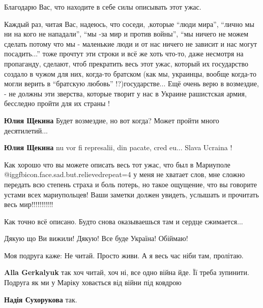 \begin{itemize}

Благодарю Вас, что находите в себе силы описывать этот ужас.

Каждый раз, читая Вас, надеюсь, что соседи, ,которые \enquote{люди мира},
\enquote{лично мы ни на кого не нападали}, \enquote{мы -за мир и против войны},
\enquote{мы ничего не можем сделать потому что мы - маленькие люди и от нас
ничего не зависит и нас могут посадить...} тоже прочтут эти строки и всё же
хоть что-то, даже несмотря на пропаганду, сделают, чтоб прекратить весь этот
ужас, который их государство создало в чужом для них, когда-то братском (как
мы, украинцы, вообще когда-то могли верить в \enquote{братскую любовь}
!?)государстве...  Ещё очень верю в возмездие, - не должны эти зверства,
которые творит у нас в Украине рашистская армия, бесследно пройти для их страны
!

\begin{itemize} %
\textbf{Юлия Щекина} Будет возмездие, но вот когда? Может пройти много десятилетий...

\textbf{Юлия Щекина} nu vor fi represalii, din pacate, cred eu... Slava Ucraina !
\end{itemize} %


Как хорошо что вы можете описать весь тот ужас, что был в Мариуполе  @igg{fbicon.face.sad.but.relieved}{repeat=4}  у
меня не хватает слов, мне сложно передать всю степень страха и боль потерь, но
такое ощущение, что вы говорите устами всех мариупольцев! Ваши заметки должен
увидеть, услышать и прочитать весь мир!!!!!!!!!!!


Как точно всё описано. Будто снова оказываешься там и сердце сжимается...

Дякую що Ви вижили! Дякую! Все буде Україна! Обіймаю!


Моя подруга каже: Не читай. Просто живи.
А я весь час ніби там, пролітаю.

\begin{itemize} %
\textbf{Alla Gerkalyuk} так хоч читай, хоч ні, все одно війна йде. Її треба зупинити. Подруга як ми у Маріку ховається від війни під ковдрою

\textbf{Надія Сухорукова} так.
\end{itemize} %


\end{itemize}
